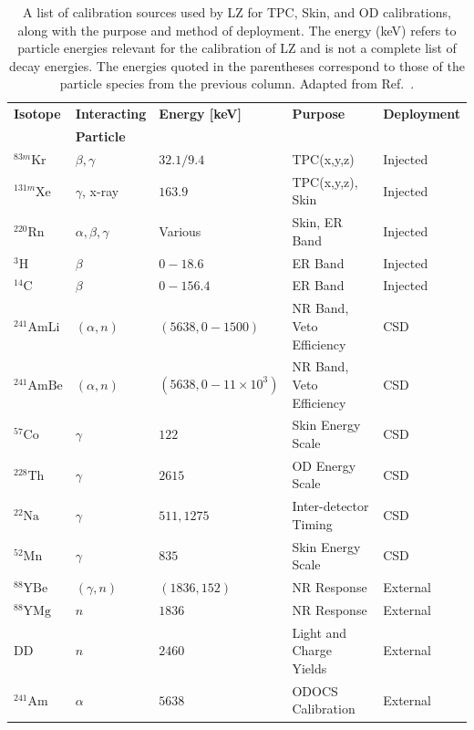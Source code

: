 \begin{table}[!h]
    \centering
    \caption[A list of calibration sources used by LZ for TPC, Skin, and OD calibrations, along with the purpose and method of deployment.]{A list of calibration sources used by LZ for TPC, Skin, and OD calibrations, along with the purpose and method of deployment. The energy (keV) refers to particle energies relevant for the calibration of LZ and is not a complete list of decay energies. The energies quoted in the parentheses correspond to those of the particle species from the previous column. Adapted from Ref.~\cite{LZ:2024bsz,lkorley:thesis}.}
    \begin{tabular}{lllll}
         \hline\hline
         \textbf{Isotope}&\textbf{Interacting}&\textbf{Energy [keV]}&\textbf{Purpose}&\textbf{Deployment}\\
         &\textbf{Particle}& & & \\
         \hline
         $^{83m}\text{Kr}$ & $\beta, \gamma$ & $32.1/9.4$ &TPC(x,y,z) & Injected\\
         $^{131m}\text{Xe}$& $\gamma$, x-ray & $163.9$ & TPC(x,y,z), Skin & Injected\\
         $^{220}\text{Rn}$& $\alpha,\beta,\gamma$ & Various \cite{Jorg:2023nvl} & Skin, ER Band & Injected\\
         $^{3}\text{H}$& $\beta$ & $0-18.6$ &ER Band & Injected\\
         $^{14}\text{C}$& $\beta$ & $0-156.4$ &ER Band & Injected\\
         $^{241}\text{AmLi}$& $(\alpha,n)$ & $(5638, 0-1500)$ & NR Band, Veto Efficiency & CSD\\
         $^{241}\text{AmBe}$& $(\alpha,n)$ & $(5638, 0-11\times10^{3})$ & NR Band, Veto Efficiency & CSD\\
         $^{57}\text{Co}$& $\gamma$ & $122$ &Skin Energy Scale & CSD\\
         $^{228}\text{Th}$& $\gamma$ & $2615$ &OD Energy Scale & CSD\\
         $^{22}\text{Na}$& $\gamma$ & $511, 1275$ &Inter-detector Timing & CSD\\
         $^{52}\text{Mn}$& $\gamma$ & $835$ &Skin Energy Scale & CSD\\
         $^{88}\text{YBe}$& $(\gamma,n)$ & $(1836,152)$ &NR Response & External\\
         $^{88}\text{YMg}$& $n$ & $1836$ & NR Response & External\\
         DD& $n$ & $2460$ & Light and Charge Yields & External\\
         $^{241}\text{Am}$& $\alpha$ & $5638$ &ODOCS Calibration & External\\
         \hline\hline
    \end{tabular}
    \label{tab:LZ/CalibrationSources}
\end{table}

